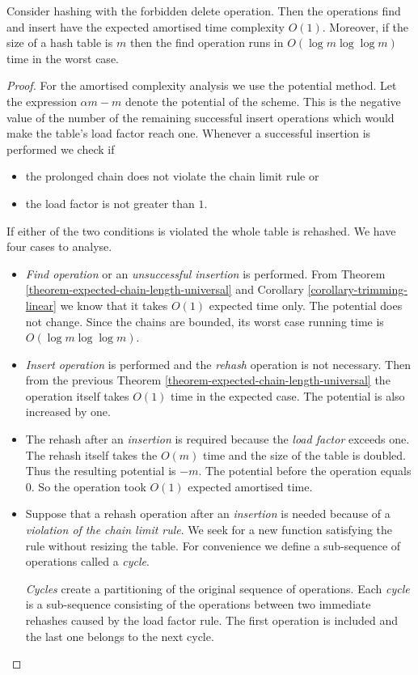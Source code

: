 \begin{theorem}
\label{theorem-no-delete-time}
Consider hashing with the forbidden delete operation. Then the operations find and insert have the expected amortised time complexity $O(1)$. Moreover, if the size of a hash table is $m$ then the find operation runs in $O(\log m \log \log m)$ time in the worst case.
\end{theorem}
\begin{proof}
For the amortised complexity analysis we use the potential method. Let the expression $\alpha m - m$ denote the potential of the scheme. This is the negative value of the number of the remaining successful insert operations which would make the table's load factor reach one. Whenever a successful insertion is performed we check if 
\begin{itemize} 
\item the prolonged chain does not violate the chain limit rule or
\item the load factor is not greater than $1$.
\end{itemize} If either of the two conditions is violated the whole table is rehashed. We have four cases to analyse.
\begin{itemize}
\item \emph{Find operation} or an \emph{unsuccessful insertion} is performed. From Theorem \ref{theorem-expected-chain-length-universal} and Corollary \ref{corollary-trimming-linear} we know that it takes $O(1)$ expected time only. The potential does not change. Since the chains are bounded, its worst case running time is $O(\log m \log \log m)$.

\item \emph{Insert operation} is performed and the \emph{rehash} operation is not necessary. Then from the previous Theorem \ref{theorem-expected-chain-length-universal} the operation itself takes $O(1)$ time in the expected case. The potential is also increased by one.

\item The rehash after an \emph{insertion} is required because the \emph{load factor} exceeds one. The rehash itself takes the $O(m)$ time and the size of the table is doubled. Thus the resulting potential is $-m$. The potential before the operation equals $0$. So the operation took $O(1)$ expected amortised time.

\item Suppose that a rehash operation after an \emph{insertion} is needed because of a \emph{violation of the chain limit rule}. We seek for a new function satisfying the rule without resizing the table. For convenience we define a sub-sequence of operations called a \emph{cycle}.
\begin{definition}
\label{cycle}
\emph{Cycles} create a partitioning of the original sequence of operations. Each \emph{cycle} is a sub-sequence consisting of the operations between two immediate rehashes caused by the load factor rule. The first operation is included and the last one belongs to the next cycle.
\end{definition}
  

\end{itemize}
\end{proof}
